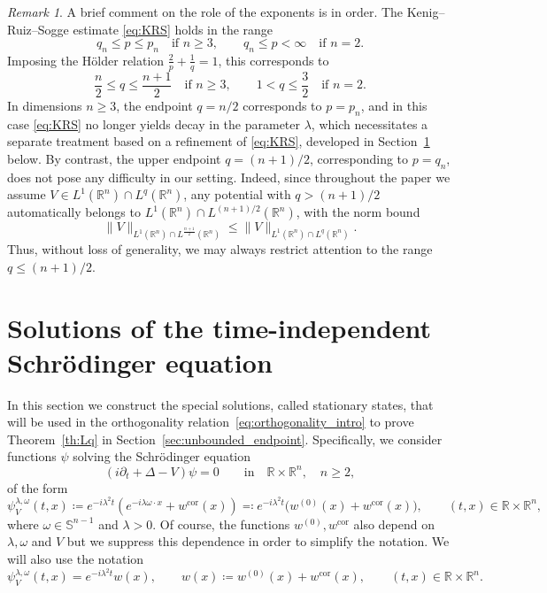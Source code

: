 \documentclass[11pt,a4paper]{amsart}
\theoremstyle{remark}
\newtheorem{remark}[proposition]{Remark}
\theoremstyle{definition}
\newcommand{\R}{\mathbb{R}}
\begin{document}
\begin{remark}\label{rmrk:numer} A brief comment on the role of the exponents is in order. The Kenig--Ruiz--Sogge estimate \eqref{eq:KRS} holds in the range
\[
q_n \le p \leq p_n \quad \text{if } n\geq3, \qquad q_n \le p < \infty \quad \text{if } n=2.
\]
Imposing the H\"older relation $\frac{2}{p}+\frac{1}{q}=1$, this corresponds to
\[
\frac{n}{2} \leq q \leq \frac{n+1}{2} \quad \text{if } n\geq3, \qquad 1< q \leq \frac{3}{2} \quad \text{if } n=2.
\]
In dimensions $n\ge3$, the endpoint $q=n/2$ corresponds to $p=p_n$, and in this case \eqref{eq:KRS} no longer yields decay in the parameter $\lambda$, which necessitates a separate treatment based on a refinement of \eqref{eq:KRS}, developed in Section~\ref{sec:timeindependent_solutions} below. By contrast, the upper endpoint $q=(n+1)/2$, corresponding to $p=q_n$, does not pose any difficulty in our setting. Indeed, since throughout the paper we assume $V\in L^1(\R^n)\cap L^q(\R^n)$, any potential with $q>(n+1)/2$ automatically belongs to $L^1(\R^n)\cap L^{(n+1)/2}(\R^n)$, with the norm bound
\[
\|V\|_{L^1(\R^n)\cap L^{\frac{n+1}{2}}(\R^n)} \leq \|V\|_{L^1(\R^n)\cap L^q(\R^n)}.
\]
Thus, without loss of generality, we may always restrict attention to the range $q\leq (n+1)/2$.
\end{remark}

\section{Solutions of the time-independent Schr\"odinger equation}\label{sec:timeindependent_solutions}
In this section we construct the special solutions, called stationary states, that will be used in the orthogonality relation~\eqref{eq:orthogonality_intro} to prove Theorem~\ref{th:Lq} in Section~\ref{sec:unbounded_endpoint}. Specifically, we consider functions $\psi$ solving the Schr\"odinger equation
\begin{equation}\label{sch_timeind}
(i\partial_t +\Delta-V)\psi =0 \qquad\mathrm{in}\quad \R\times \R^n,\quad n\geq 2,
\end{equation}
of the form
\begin{equation}\label{eq:steadysol}
\psi_V ^{\lambda,\omega}(t,x)\coloneqq e^{-i\lambda^2 t}(e^{-i\lambda \omega\cdot x}+w^{\mathrm{cor}} (x))\eqqcolon e^{-i\lambda^2 t}\big(w^{(0)}(x)+w^{\mathrm{cor}}(x)\big),\qquad  (t,x)\in\R\times \R^n,
\end{equation}
where $\omega\in\mathbb S^{n-1}$ and  $\lambda>0$. Of course, the functions $w^{(0)},w^{\mathrm{cor}}$ also depend on $\lambda,\omega$ and $V$ but we suppress this dependence in order to simplify the notation. We will also use the notation
\[
\psi_V ^{\lambda,\omega}(t,x)=e^{-i\lambda^2 t}w(x),\qquad w(x)\coloneqq w^{(0)}(x)+w^{\mathrm{cor}}(x),\qquad (t,x)\in\R\times \R^n.
\]
\end{document}
